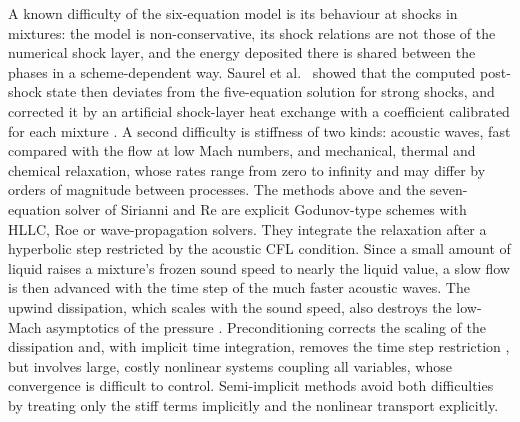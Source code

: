 A known difficulty of the six-equation model is its behaviour at shocks in mixtures: the model is non-conservative, its
shock relations \cite{SaurelGavrilyukRenaud2003} are not those of the numerical shock layer, and the energy deposited
there is shared between the phases in a scheme-dependent way. Saurel et al.\ \cite{SPB2009} showed that the computed
post-shock state then deviates from the five-equation solution for strong shocks, and corrected it by an artificial
shock-layer heat exchange with a coefficient calibrated for each mixture \cite{Petitpas2007}. A second difficulty is
stiffness of two kinds: acoustic waves, fast compared with the flow at low Mach numbers, and mechanical, thermal and
chemical relaxation, whose rates range from zero to infinity and may differ by orders of magnitude between processes.
The methods above \cite{SPB2009,PelantiShyue2014,Pelanti2022,DeLorenzo2018} and the seven-equation solver of Sirianni
and Re \cite{SirianniRe2026} are explicit Godunov-type schemes with HLLC, Roe or wave-propagation solvers. They
integrate the relaxation after a hyperbolic step restricted by the acoustic CFL condition. Since a small amount of
liquid raises a mixture's frozen sound speed to nearly the liquid value, a slow flow is then advanced with the time
step of the much faster acoustic waves. The upwind dissipation, which scales with the sound
speed, also destroys the low-Mach asymptotics of the pressure
\cite{GuillardViozat1999,GuillardMurrone2004,Dellacherie2010}. Preconditioning corrects the scaling of the dissipation
\cite{Turkel1987,Pelanti2017} and, with implicit time integration, removes the time step restriction
\cite{LeMartelot2013}, but involves large, costly nonlinear systems coupling all variables, whose convergence is
difficult to control. Semi-implicit methods avoid both difficulties by treating only the stiff terms implicitly and the
nonlinear transport explicitly.

